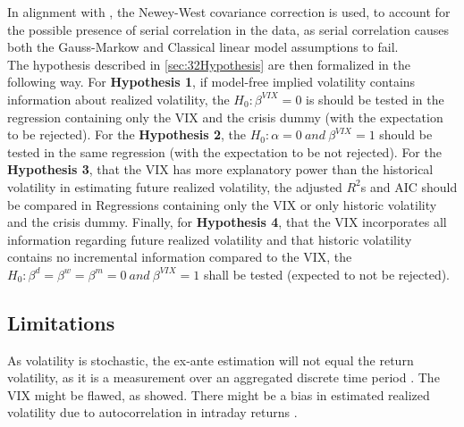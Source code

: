 In alignment with \textcite{corsi2009}, the Newey-West covariance correction is used, to account for the possible presence of serial correlation in the data, as serial correlation causes both the Gauss-Markow and Classical linear model assumptions to fail. \\
The hypothesis described in \ref{sec:32Hypothesis} are then formalized in the following way. For \textbf{Hypothesis 1}, if model-free implied volatility contains information about realized volatility, the $H_{0}: \beta^{VIX} = 0$ is should be tested in the regression containing only the VIX and the crisis dummy (with the expectation to be rejected). For the \textbf{Hypothesis 2}, the $H_{0}: \alpha = 0 \ and \ \beta^{VIX} = 1$ should be tested in the same regression (with the expectation to be not rejected). For the \textbf{Hypothesis 3}, that the VIX has more explanatory power than the historical volatility in estimating future realized volatility, the adjusted $R^{2}$s and AIC should be compared in Regressions containing only the VIX or only historic volatility and the crisis dummy. Finally, for \textbf{Hypothesis 4}, that the VIX incorporates all information regarding future realized volatility and that historic volatility contains no incremental information compared to the VIX, the $H_{0}: \beta^{d} = \beta^{w} = \beta^{m} = 0 \ and \ \beta^{VIX} = 1$ shall be tested (expected to not be rejected). 



\subsection{Limitations}\label{sec:43Limits}
As volatility is stochastic, the ex-ante estimation will not equal the return volatility, as it is a measurement over an aggregated discrete time period \parencite{andersen2001}.
The VIX might be flawed, as \textcite{jiang2007} showed.
There might be a bias in estimated realized volatility due to autocorrelation in intraday returns \parencite{jiang2003}. 
